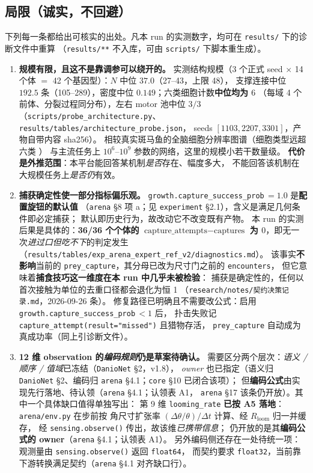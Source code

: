 \subsection{局限（诚实，不回避）}

下列每一条都给出可核实的出处。凡本 run 的实测数字，均可在 \texttt{results/} 下的诊断文件中重算
（\texttt{results/**} 不入库，可由 \texttt{scripts/} 下脚本重生成）。

\begin{enumerate}
  \item \textbf{规模有限，且这不是靠调参可以绕开的。}
实测结构规模（3 个正式 seed $\times$ 14 个体 $=$ 42 个基因型）：$N$ 中位 $37.0$（27--43，上限 48），
支撑连接中位 $192.5$ 条（105--289），密度中位 $0.149$；六类细胞计数\textbf{中位均为 $6$}
（每域 4 个前体、分裂过程同分布），左右 motor 池中位 $3/3$
（\texttt{scripts/probe\_architecture.py}、\texttt{results/tables/architecture\_probe.json}，
seeds $[1103,2207,3301]$，产物自带内容 sha256）。
  相较真实斑马鱼的全脑细胞分辨率图谱（细胞类型远超六类 \citep{bib84_kunst2019}）
  与主流任务上 $10^{6}$--$10^{9}$ 参数的网络，这里的规模小若干数量级。
  \textbf{代价是外推范围}：本平台能回答某机制\emph{是否}存在、幅度多大，
  不能回答该机制在大规模任务上\emph{是否仍}有效。

  \item \textbf{捕获确定性使一部分指标偏乐观。}
  \texttt{growth.capture\_success\_prob}\,$=1.0$ 是\textbf{配置旋钮的默认值}
  （\texttt{arena} \S8 项 a；见 \texttt{experiment} \S2.1），含义是满足几何条件即必定捕获；
  默认即历史行为，故改动它不改变既有产物。
  本 run 的实测后果是具体的：\textbf{36/36 个个体的
  $\text{capture\_attempts}-\text{captures}$ 为 $0$}，即无一次\emph{进过口但吃不下}的判定发生
  （\texttt{results/tables/exp\_arena\_expert\_ref\_v2/diagnostics.md}）。
  该事实\textbf{不影响}当前的 \texttt{prey\_capture}，其分母已改为尺寸门之前的 \texttt{encounters}，
  但它意味着\textbf{捕食技巧这一维度在本 run 中几乎未被检验}：
  捕获是确定性的，任何以首次接触为单位的去重口径都会退化为恒 1
  （\texttt{research/notes/契约决策记录.md}，2026-09-26 条）。
  修复路径已明确且不需要改公式：启用 \texttt{growth.capture\_success\_prob}\,$<1$ 后，
  扑击失败记 \texttt{capture\_attempt(result="missed")} 且猎物存活，
  \texttt{prey\_capture} 自动成为真成功率（同上引诊断文件）。

  \item \textbf{12 维 observation 的\emph{编码规则}仍是草案待确认。}
  需要区分两个层次：\emph{语义 / 顺序 / 值域}已冻结（\texttt{DanioNet} \S2，v1.8），
  \emph{owner} 也已指定（语义归 \texttt{DanioNet} \S2、编码归 \texttt{arena} \S4.1；\texttt{core} \S10 已闭合该项）；
  但\textbf{编码公式}由实现先行落地、待认领（\texttt{arena} \S4.1；认领表 A1，
  \texttt{arena} \S17 该条仍开放）。其中一个具体缺口值得单独写出：
  第 9 维 \texttt{looming\_rate} \textbf{已按 A5 落地}：\texttt{arena/env.py} 在步前按
  角尺寸扩张率 $(\Delta\theta/\theta)/\Delta t$ 计算、经 $R_{\text{loom}}$ 归一并缓存，
  经 \texttt{sensing.observe()} 传出，故该维\emph{已携带信息}；
  仍开放的是其\textbf{编码公式的 owner}（\texttt{arena} \S{}4.1；认领表 A1）。
  另外编码侧还存在一处待统一项：观测量由 \texttt{sensing.observe()} 返回 \texttt{float64}，
  而契约要求 \texttt{float32}，当前靠下游转换满足契约（\texttt{arena} \S4.1 对齐缺口行）。


\end{enumerate}
